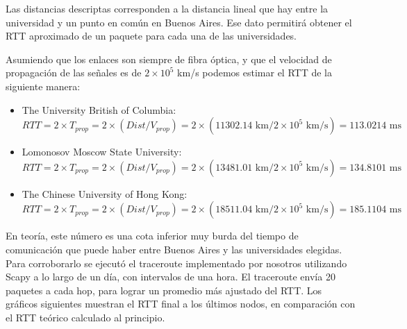 Las distancias descriptas corresponden a la distancia lineal que hay entre la universidad y un punto en común en Buenos Aires. Ese dato permitirá obtener el RTT aproximado de un paquete para cada una de las universidades. 

Asumiendo que los enlaces son siempre de fibra óptica, y que el velocidad de propagación de las señales es de $2 \times 10^{5}$ km/s podemos estimar el RTT de la siguiente manera: 

\begin{itemize}
 \item The University British of Columbia: 
\begin{equation}
 	RTT = 2 \times T_{prop} = 2 \times (Dist / V_{prop}) = 2 \times (11302.14 \text{ km} / 2\times10^5 \text{ km/s}) = 113.0214 \text{ ms}
\end{equation}
 
 \item Lomonosov Moscow State University: 
 \begin{equation}
 	RTT = 2 \times T_{prop} = 2 \times (Dist / V_{prop}) = 2 \times (13481.01 \text{ km} / 2\times10^5 \text{ km/s}) = 134.8101  \text{ ms}
 \end{equation}
 
 \item The Chinese University of Hong Kong: 
 \begin{equation}
 	RTT = 2 \times T_{prop} = 2 \times (Dist / V_{prop}) = 2 \times(18511.04 \text{ km} / 2\times10^5 \text{ km/s}) = 185.1104  \text{ ms}
 \end{equation}

\end{itemize}


En teor\'ia, este n\'umero es una cota inferior muy burda del tiempo de comunicaci\'on que puede haber entre Buenos Aires y las universidades elegidas. Para corroborarlo se ejecutó el traceroute implementado por nosotros utilizando Scapy a lo largo de un día, con intervalos de una hora. El traceroute envía 20 paquetes a cada hop, para lograr un promedio más ajustado del RTT. Los gr\'aficos siguientes muestran el RTT final a los \'ultimos nodos, en comparaci\'on con el RTT te\'orico calculado al principio. 




